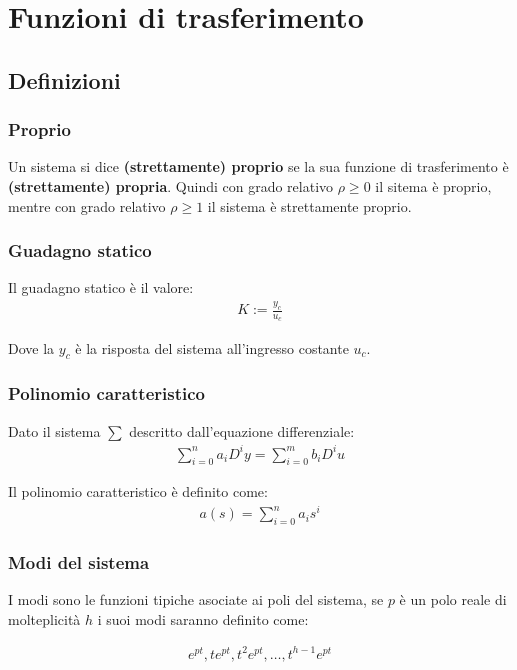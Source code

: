 \chapter{Funzioni di trasferimento}

\section{Definizioni}
\subsection{Proprio}
Un sistema si dice \textbf{(strettamente) proprio} se la sua funzione di trasferimento
\`e \textbf{(strettamente) propria}.
Quindi con grado relativo $\rho \geq 0$ il sitema \`e proprio, mentre con grado relativo $\rho \geq 1$ il sistema \`e strettamente proprio.


\subsection{Guadagno statico}
Il guadagno statico \`e il valore:
\begin{align}
  K := \frac{y_c}{u_c}
\end{align}

Dove la $y_c$ \`e la risposta del sistema all'ingresso costante $u_c$.


\subsection{Polinomio caratteristico}

Dato il sistema $\sum$ descritto dall'equazione differenziale:
\begin{align}
  \sum_{i=0}^n a_i D^i y = \sum_{i=0}^m b_i D^i u
\end{align}



Il polinomio caratteristico \`e definito come:
\begin{align}
  a(s) = \sum_{i=0}^n a_i s^i
\end{align}


\subsection{Modi del sistema}

I modi sono le funzioni tipiche asociate ai poli del sistema,
se $p$ \`e un polo reale di molteplicit\`a $h$ i suoi modi saranno definito come:

\begin{align}
  e^{pt}, te^{pt}, t^2e^{pt}, \dots, t^{h-1}e^{pt}
\end{align}

